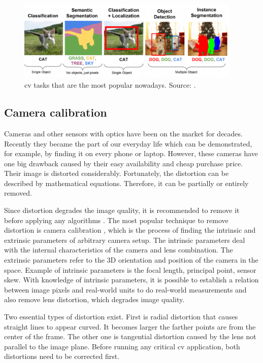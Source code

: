     \begin{figure}[ht]
        \centering
        \includegraphics[width=0.95\textwidth]{resources/computer_vision_tasks.png}
        \caption{\Gls{cv} tasks that are the most popular nowadays. Source: \cite{cs231n}.}
        \label{fig:computer-vision-tasks}
    \end{figure}
    
    
    \subsection{Camera calibration}\label{camera_calibration}
        Cameras and other sensors with optics have been on the market for decades. Recently they became the part of our everyday life which can be demonstrated, for example, by finding it on every phone or laptop. However, these cameras have one big drawback caused by their easy availability and cheap purchase price. Their image is distorted considerably. Fortunately, the distortion can be described by mathematical equations. Therefore, it can be partially or entirely removed. 
        
        Since distortion degrades the image quality, it is recommended to remove it before applying any algorithms \cite{Szeliski:2010:CVA:1941882}. The most popular technique to remove distortion is camera calibration \cite{zhang1999flexible}, which is the process of finding the intrinsic and extrinsic parameters of arbitrary camera setup. The intrinsic parameters deal with the internal characteristics of the camera and lens combination. The extrinsic parameters refer to the 3D orientation and position of the camera in the space. Example of intrinsic parameters is the focal length, principal point, sensor skew. With knowledge of intrinsic parameters, it is possible to establish a relation between image pixels and real-world units to do real-world measurements and also remove lens distortion, which degrades image quality. 
        
        Two essential types of distortion exist. First is radial distortion that causes straight lines to appear curved. It becomes larger the farther points are from the center of the frame. The other one is tangential distortion caused by the lens not parallel to the image plane. Before running any critical \gls{cv} application, both distortions need to be corrected first. 
        
